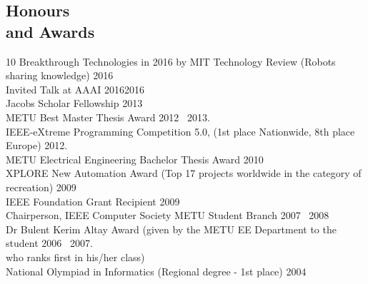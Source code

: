 \documentclass[margin,line,10pt]{resume}
\begin{document}
\begin{resume}
\section{\mysidestyle \textcolor{olgray}{Honours \\and Awards}}
10 Breakthrough Technologies in 2016 by MIT Technology Review (Robots sharing knowledge) \hfill 2016 \vspace{1mm}\\
Invited Talk at AAAI 2016\hfill 2016 \vspace{1mm}\\
Jacobs Scholar Fellowship \hfill 2013 \vspace{1mm}\\
METU Best Master Thesis Award \hfill  2012 \textendash ~2013{\color{white}.}\vspace{1mm}\\
IEEE-eXtreme Programming Competition 5.0,  (1st place Nationwide, 8th place Europe) \hfill 2012{\color{white}.}\vspace{1mm}\\
METU Electrical Engineering Bachelor Thesis Award  \hfill 2010 \vspace{1mm}\vspace{1mm}\\
XPLORE New Automation Award (Top 17 projects worldwide in the category of recreation)  \hfill 2009 \vspace{1mm}\vspace{1mm}\\
IEEE Foundation Grant Recipient \hfill 2009 \vspace{1mm}\vspace{1mm}\\
Chairperson, IEEE Computer Society METU Student Branch \hfill 2007 \textendash ~2008 \vspace{1mm}\vspace{1mm} \\
Dr Bulent Kerim Altay Award  (given by the METU EE Department to the student \hfill 2006 \textendash ~2007{\color{white}.}\\ who ranks first in his/her class) \vspace{1mm}\vspace{1mm}\\
National Olympiad in Informatics (Regional degree - 1st place) \hfill 2004 \vspace{1mm}\vspace{1mm}\\
\vspace{-4mm}



\end{resume}
\end{document}
